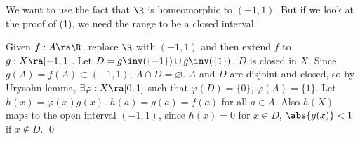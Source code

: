  We want to use the fact that \(\R\) is homeomorphic to \((-1, 1)\). But if we look at the proof of (1), we need the range to be a closed interval.

Given \(f: A \ra \R\), replace \(\R\) with \((-1, 1)\) and then extend \(f\) to \(g : X \ra [-1, 1]\). Let \(D = g\inv(\{-1\}) \cup g\inv(\{1\})\). \(D\) is closed in \(X\). Since \(g(A) = f(A) \subset (-1, 1)\), \(A \cap D = \varnothing\). \(A\) and \(D\) are disjoint and closed, so by Urysohn lemma, \(\exists \varphi : X \ra [0, 1]\) such that \(\varphi(D) = \{0\}\), \(\varphi(A) = \{1\}\). Let \(h(x) = \varphi(x)g(x)\). \(h(a) = g(a) = f(a)\) for all \(a \in A\). Also \(h(X)\) maps to the open interval \((-1, 1)\), since \(h(x) = 0\) for \(x \in D\), \(\abs{g(x)} < 1\) if \(x \notin D\). \qed

\pagebreak
